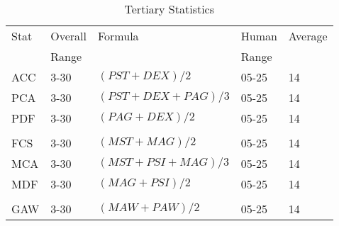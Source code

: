 \begin{table}[htb]
\centering
	\caption{Tertiary Statistics}
	\begin{tabular}{||l|l|l|l|l||} \hline
    Stat & Overall  & Formula                  & Human     & Average \\ 
         & Range    &                          & Range     &         \\ \hline
	ACC  & 3-30     & \((PST+DEX)/2     \)     & 05-25     & 14 \\
	PCA  & 3-30     & \((PST+DEX+PAG)/3 \)     & 05-25     & 14 \\
	PDF  & 3-30     & \((PAG+DEX)/2     \)     & 05-25     & 14 \\
	     &          &                          &           &    \\	\hline
	FCS  & 3-30     & \((MST+MAG)/2     \)     & 05-25     & 14 \\
	MCA  & 3-30     & \((MST+PSI+MAG)/3 \)     & 05-25     & 14 \\
	MDF  & 3-30     & \((MAG+PSI)/2     \)     & 05-25     & 14 \\
	     &          &                          &           &    \\ \hline
	GAW  & 3-30     & \((MAW+PAW)/2     \)     & 05-25     & 14 \\ \hline
	\end{tabular}
\end{table}

